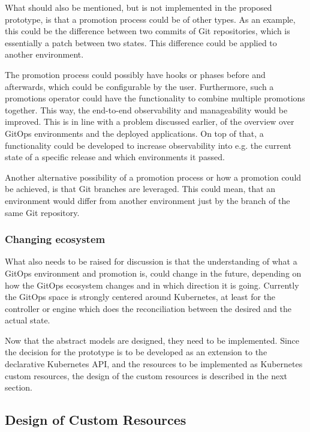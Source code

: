 What should also be mentioned, but is not implemented in the proposed prototype,
is that a promotion process could be of other types.
As an example, this could be the difference between two commits of Git repositories,
which is essentially a patch between two states. This difference could be applied to another environment.

The promotion process could possibly have hooks or phases before and afterwards, which could be configurable by the user.
Furthermore, such a promotions operator could have the functionality to combine multiple promotions together.
This way, the end-to-end observability and manageability would be improved.
This is in line with a problem discussed earlier, of the overview over GitOps environments
and the deployed applications. On top of that, a functionality could be developed
to increase observability into e.g. the current state of a specific release and which environments it passed.

Another alternative possibility of a promotion process or how a promotion could be achieved,
is that Git branches are leveraged.
This could mean, that an environment would differ from another environment just by the branch of the same Git repository.

\subsubsection*{Changing ecosystem}

What also needs to be raised for discussion is that
the understanding of what a GitOps environment and promotion is,
could change in the future, depending on how the GitOps ecosystem changes
and in which direction it is going. Currently the GitOps space
is strongly centered around Kubernetes, at least for the controller or engine which does the reconciliation
between the desired and the actual state.

Now that the abstract models are designed,
they need to be implemented.
Since the decision for the prototype is to be developed
as an extension to the declarative Kubernetes API,
and the resources to be implemented as Kubernetes custom resources,
the design of the custom resources is described in the next section.






\subsection{Design of Custom Resources}
	
